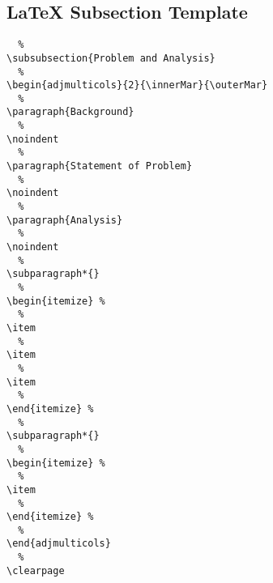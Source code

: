 \subsection[\LaTeX{} Subsection Template]{\LaTeX{} Subsection Template}
\begin{verbatim}
  %
\subsubsection{Problem and Analysis}
  %
\begin{adjmulticols}{2}{\innerMar}{\outerMar}
  %
\paragraph{Background}
  %
\noindent
  %
\paragraph{Statement of Problem}
  %
\noindent
  %
\paragraph{Analysis}
  %
\noindent
  %
\subparagraph*{}
  %
\begin{itemize} %
  %
\item
  %
\item
  %
\item
  %
\end{itemize} %
  %
\subparagraph*{}
  %
\begin{itemize} %
  %
\item
  %
\end{itemize} %
  %
\end{adjmulticols}
  %
\clearpage

\end{verbatim}


